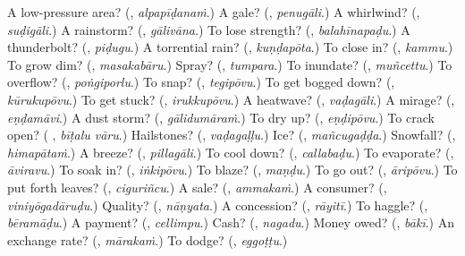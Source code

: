 \begin{tcolorbox}[breakable,colback=teal!4,colframe=teal!35!black,title={Before you move on}]
A low-pressure area? (\textbf{}, \emph{alpapīḍanaṁ}.) A gale? (\textbf{}, \emph{penugāli}.) A whirlwind? (\textbf{}, \emph{suḍigāli}.) A rainstorm? (\textbf{}, \emph{gālivāna}.) To lose strength? (\textbf{}, \emph{balahīnapaḍu}.) A thunderbolt? (\textbf{}, \emph{piḍugu}.) A torrential rain? (\textbf{}, \emph{kuṇḍapōta}.) To close in? (\textbf{}, \emph{kammu}.) To grow dim? (\textbf{}, \emph{masakabāru}.) Spray? (\textbf{}, \emph{tumpara}.) To inundate? (\textbf{}, \emph{muñcettu}.) To overflow? (\textbf{}, \emph{poṅgiporlu}.) To snap? (\textbf{}, \emph{tegipōvu}.) To get bogged down? (\textbf{}, \emph{kūrukupōvu}.) To get stuck? (\textbf{}, \emph{irukkupōvu}.) A heatwave? (\textbf{}, \emph{vaḍagāli}.) A mirage? (\textbf{}, \emph{eṇḍamāvi}.) A dust storm? (\textbf{}, \emph{gālidumāraṁ}.) To dry up? (\textbf{}, \emph{eṇḍipōvu}.) To crack open? (\textbf{ }, \emph{bīṭalu vāru}.) Hailstones? (\textbf{}, \emph{vaḍagaḷḷu}.) Ice? (\textbf{}, \emph{mañcugaḍḍa}.) Snowfall? (\textbf{}, \emph{himapātaṁ}.) A breeze? (\textbf{}, \emph{pillagāli}.) To cool down? (\textbf{}, \emph{callabaḍu}.) To evaporate? (\textbf{}, \emph{āviravu}.) To soak in? (\textbf{}, \emph{iṅkipōvu}.) To blaze? (\textbf{}, \emph{maṇḍu}.) To go out? (\textbf{}, \emph{āripōvu}.) To put forth leaves? (\textbf{}, \emph{ciguriñcu}.) A sale? (\textbf{}, \emph{ammakaṁ}.) A consumer? (\textbf{}, \emph{viniyōgadāruḍu}.) Quality? (\textbf{}, \emph{nāṇyata}.) A concession? (\textbf{}, \emph{rāyitī}.) To haggle? (\textbf{}, \emph{bēramāḍu}.) A payment? (\textbf{}, \emph{cellimpu}.) Cash? (\textbf{}, \emph{nagadu}.) Money owed? (\textbf{}, \emph{bākī}.) An exchange rate? (\textbf{}, \emph{mārakaṁ}.) To dodge? (\textbf{}, \emph{eggoṭṭu}.)
\end{tcolorbox}
